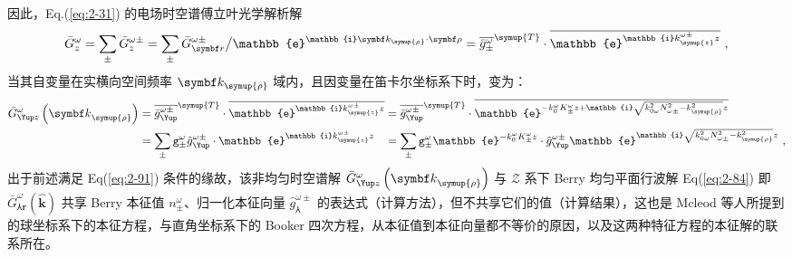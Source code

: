 因此，Eq.(\ref{eq:2-31}) 的电场时空谱傅立叶光学解析解
\begin{equation} \label{eq:2-145}
	\bar{G}^{\omega}_{z} = \sum_{\pm} \bar{G}^{\omega\pm}_{z} = \sum_{\pm} \bar{G}^{\omega\pm}_{\symbf r} \big/ \mathbb{e}^{\mathbb{i} \symbf k_{\symup{\rho}} \cdot {\symbf \rho}} = \overline{\bar{g}^{\omega}_{\pm}}^{\symup{T}} \cdot \overline{\mathbb{e}^{ \mathbb{i} k^{\omega\pm}_{\symup{z}} z}} ~,
\end{equation}
当其自变量在实横向空间频率 $\symbf k_{\symup{\rho}}$ 域内，且因变量在笛卡尔坐标系下时，变为：
\begin{subequations} \label{eq:2-146}
\begin{align}
	\bar{G}^{\omega}_{\Yup z} \left( {\symbf k}_{\symup{\rho}} \right) &= \overline{\bar{g}^{\omega\pm}_{\Yup}}^{\symup{T}} \cdot \overline{\mathbb{e}^{ \mathbb{i} k^{\omega\pm}_{\symup{z}} z}} \hspace{-1.0em}&&= \overline{\bar{g}^{\omega\pm}_{\Yup}}^{\symup{T}} \cdot \overline{\mathbb{e}^{ - k^{\omega}_{0} K^{\omega}_{\pm} z + \mathbb{i} \sqrt{ k^{2}_{0\omega} N^{2}_{\omega\pm} - k^{2}_{\symup{\rho}} } z}} \label{eq:2-146a}\\&= \sum_{\pm} {\mathtt{g}}^{\omega}_{\pm} \hat{g}^{\omega\pm}_{\Yup} \cdot \mathbb{e}^{ \mathbb{i} k^{\omega\pm}_{\symup{z}} z} \hspace{-1.0em}&&= \sum_{\pm} {\mathtt{g}}^{\omega}_{\pm} \mathbb{e}^{ - k^{\omega}_{0} K^{\omega}_{\pm} z} \cdot \hat{g}^{\omega\pm}_{\Yup} \mathbb{e}^{\mathbb{i} \sqrt{ k^{2}_{0\omega} N^{2}_{\omega\pm} - k^{2}_{\symup{\rho}} } z} \label{eq:2-146b}~,
\end{align}
\end{subequations}
出于前述满足 Eq(\ref{eq:2-91}) 条件的缘故，该非均匀时空谱解 $\bar{G}^{\omega}_{\Yup z} \left( {\symbf k}_{\symup{\rho}} \right)$ 与 $\mathcal Z$ 系下 Berry 均匀平面行波解 Eq(\ref{eq:2-84}) 即 $\bar{G}^{\omega}_{\Yup \symbf r} \left( \hat{\symbf k} \right)$ 共享 Berry 本征值 $n^{\omega}_{\pm}$、归一化本征向量 $\hat{g}^{\omega\pm}_{\Yup}$ 的表达式（计算方法），但不共享它们的值（计算结果），这也是 Mcleod 等人所提到的球坐标系下的本征方程，与直角坐标系下的 Booker 四次方程，从本征值到本征向量都不等价\cite{mcleodVectorFourierOptics2014}的原因，以及这两种特征方程的本征解的联系所在。

